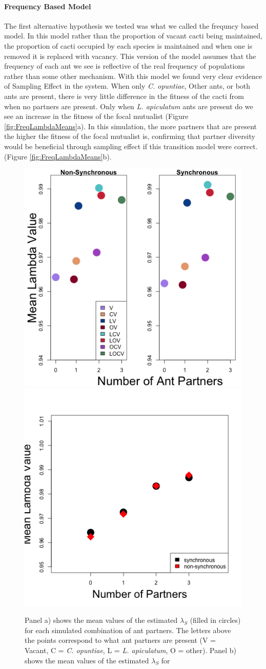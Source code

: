 \documentclass[11pt]{article}
\begin{document}
\paragraph{Frequency Based Model}
The first alternative hypothesis we tested was what we called the frequncy based model.
In this model rather than the proportion of vacant cacti being maintained, the proportion of cacti occupied by each species is maintained and when one is removed it is replaced with vacancy.
This version of the model assumes that the frequency of each ant we see is reflective of the real frequency of populations rather than some other mechanism.
With this model we found very clear evidence of Sampling Effect in the system. 
When only  \textit{C. opuntiae}, Other ants, or both ants are present, there is very little difference in the fitness of the cacti from when no partners are present. 
Only when \textit{L. apiculatum} ants are present do we see an increase in the fitness of the focal mutualist (Figure \ref{fig:FreqLambdaMeans}a).
In this simulation, the more partners that are present the higher the fitness of the focal mutualist is, confirming that partner diversity would be beneficial through sampling effect if this transition model were correct.  (Figure \ref{fig:FreqLambdaMeans}b).

\begin{figure}
\includegraphics[width=0.61\linewidth]{Figures/Lambdas_freq.png}
\includegraphics[width=0.39\linewidth]{Figures/freq_num_partners.png}
\caption{Panel a) shows the mean values of the estimated $\lambda_{S}$ (filled in circles) for each simulated combination of ant partners. The letters above the points correspond to what ant partners are present (V = Vacant, C = \textit{C. opuntiae}, L = \textit{L. apiculatum}, O = other). Panel b) shows the mean values of the estimated $\lambda_{S}$ for }
\label{app:FreqLambdaMeans}
\end{figure}
\end{document}
